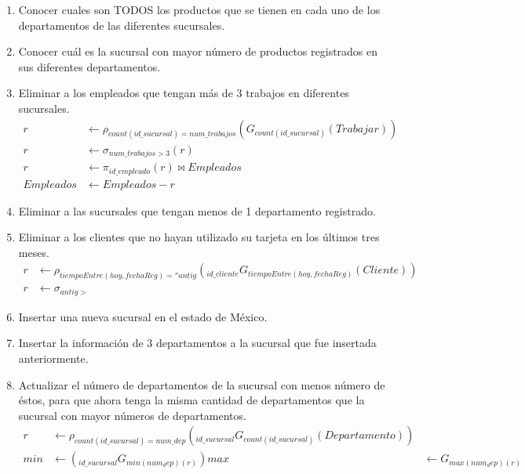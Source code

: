 \documentclass{article}
\begin{document}
\begin{enumerate}
{            Conocer cuáles son los productos que tienen en común cada uno de los
            departamentos de las diferentes sucursales.
        }
        \item {
            Conocer cuales son TODOS los productos que se tienen en cada uno de
            los departamentos de las diferentes sucursales.
        }
        \item {
            Conocer cuál es la sucursal con mayor número de productos
            registrados en sus diferentes departamentos.
        }
        \item {
            Eliminar a los empleados que tengan más de 3 trabajos en diferentes 
            sucursales.
            \begin{align*}
                r &\leftarrow \rho_{count(id\_sucursal) = num\_trabajos}
                (G_{count(id\_sucursal)}(Trabajar))\\
                r &\leftarrow \sigma_{num\_trabajos > 3} (r) \\
                r &\leftarrow \pi_{id\_empleado}(r) \bowtie Empleados\\
                Empleados &\leftarrow Empleados - r
            \end{align*}
        }
        \item {
            Eliminar a las sucursales que tengan menos de 1 departamento
            registrado.
        }
        \item {
            Eliminar a los clientes que no hayan utilizado su tarjeta en los
            últimos tres meses.
            \begin{align*}
                r &\leftarrow \rho_{tiempoEntre(hoy, fechaReg)=''antig}
                (_{id\_cliente}G_{tiempoEntre(hoy, fechaReg)}(Cliente)) \\
                r &\leftarrow \sigma_{antig >}
            \end{align*}
        }
        \item {
            Insertar una nueva sucursal en el estado de México.
        }
        \item {
            Insertar la información de 3 departamentos a la sucursal que fue
            insertada anteriormente.
        }
        \item {
            Actualizar el número de departamentos de la sucursal con menos
            número de éstos, para que ahora tenga la misma cantidad de departamentos
            que la sucursal con mayor números de departamentos.
            \begin{align*}
                r &\leftarrow \rho_{count(id\_sucursal) = num\_dep}
                (_{id\_sucursal}G_{count(id\_sucursal)}(Departamento))\\
                min &\leftarrow (_{id\_sucursal}G_{min(num_dep)(r)})
                max &\leftarrow G_{max(num_dep)(r)}
            \end{align*}
        }
    \end{enumerate}
\end{document}

